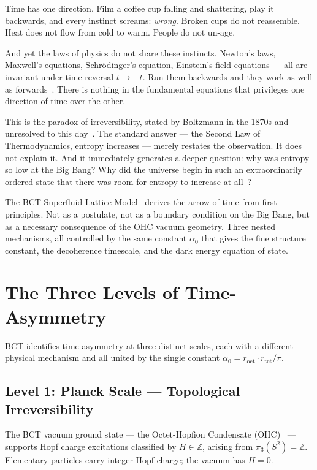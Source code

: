 \documentclass[aps,prl,twocolumn,superscriptaddress,floatfix]{revtex4-2}
\newcommand{\roct}{r_{\mathrm{oct}}}
\newcommand{\rtet}{r_{\mathrm{tet}}}
\newcommand{\azero}{\alpha_0}
\begin{document}
Time has one direction. Film a coffee cup falling and shattering, 
play it backwards, and every instinct screams: \emph{wrong}. 
Broken cups do not reassemble. Heat does not flow from cold to 
warm. People do not un-age.

And yet the laws of physics do not share these instincts. 
Newton's laws, Maxwell's equations, Schr\"{o}dinger's equation, 
Einstein's field equations --- all are invariant under time 
reversal $t \to -t$. Run them backwards and they work as well 
as forwards~\cite{Penrose2004}. There is nothing in the 
fundamental equations that privileges one direction of time 
over the other.

This is the paradox of irreversibility, stated by Boltzmann 
in the 1870s and unresolved to this day~\cite{Boltzmann1877}. 
The standard answer --- the Second Law of Thermodynamics, 
entropy increases --- merely restates the observation. 
It does not explain it. And it immediately generates a 
deeper question: why was entropy so low at the Big Bang? 
Why did the universe begin in such an extraordinarily 
ordered state that there was room for entropy to increase 
at all~\cite{Penrose1989}?

The BCT Superfluid Lattice Model~\cite{BCT_Monograph} 
derives the arrow of time from first principles. Not as 
a postulate, not as a boundary condition on the Big Bang, 
but as a necessary consequence of the OHC vacuum geometry. 
Three nested mechanisms, all controlled by the same constant 
$\azero$ that gives the fine structure constant, the 
decoherence timescale, and the dark energy equation of state.

\section{The Three Levels of Time-Asymmetry}

BCT identifies time-asymmetry at three distinct scales, 
each with a different physical mechanism and all united 
by the single constant $\azero = \roct \cdot \rtet / \pi$.

\subsection{Level 1: Planck Scale --- Topological Irreversibility}

The BCT vacuum ground state --- the Octet-Hopfion Condensate 
(OHC)~\cite{BCT_AppJH} --- supports Hopf charge excitations 
classified by $H \in \mathbb{Z}$, arising from 
$\pi_3(S^2) = \mathbb{Z}$. Elementary particles carry 
integer Hopf charge; the vacuum has $H = 0$.
\end{document}
